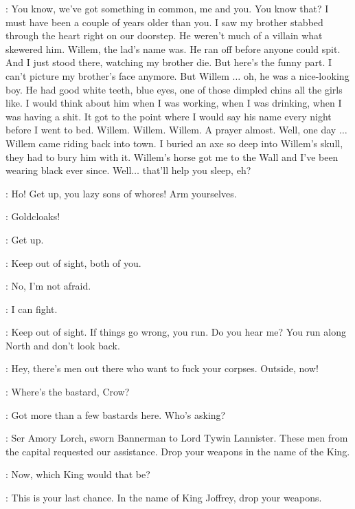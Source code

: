 \YOREN: You know, we've got something in common, me and you. You know that? I must have been a couple of years older than you. I saw my brother stabbed through the heart right on our doorstep. He weren't much of a villain what skewered him. Willem, the lad's name was. He ran off before anyone could spit. And I just stood there, watching my brother die. But here's the funny part. I can't picture my brother's face anymore. But Willem $\ldots$ oh, he was a nice-looking boy. He had good white teeth, blue eyes, one of those dimpled chins all the girls like. I would think about him when I was working, when I was drinking, when I was having a shit. It got to the point where I would say his name every night before I went to bed. Willem. Willem. Willem. A prayer almost. Well, one day $\ldots$ Willem came riding back into town. I buried an axe so deep into Willem's skull, they had to bury him with it. Willem's horse got me to the Wall and I've been wearing black ever since. Well$\ldots$ that'll help you sleep, eh? 


\YOREN: Ho! Get up, you lazy sons of whores! Arm yourselves. 

\GENDRY: Goldcloaks! 

\ARYA: Get up. 

\YOREN: Keep out of sight, both of you. 

\ARYA: No, I'm not afraid. 

\GENDRY: I can fight. 

\YOREN: Keep out of sight. If things go wrong, you run. Do you hear me? You run along North and don't look back. 


\YOREN: Hey, there's men out there who want to fuck your corpses. Outside, now! 


\AMORY: Where's the bastard, Crow? 

\YOREN: Got more than a few bastards here. Who's asking? 

\AMORY: Ser Amory Lorch, sworn Bannerman to Lord Tywin Lannister. These men from the capital requested our assistance. Drop your weapons in the name of the King. 

\YOREN: Now, which King would that be? 

\AMORY: This is your last chance. In the name of King Joffrey, drop your weapons. 

